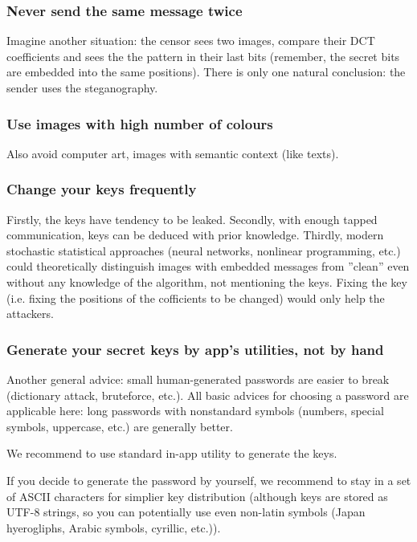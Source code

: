 \subsubsection{Never send the same message twice}

Imagine another situation: the censor sees two images, compare their DCT coefficients
and sees the the pattern in their last bits (remember, the secret bits are embedded into
the same positions). There is only one natural conclusion: the sender uses the steganography.

\subsubsection{Use images with high number of colours}
Also avoid computer art, images with semantic context (like texts).

\subsubsection{Change your keys frequently}
Firstly, the keys have tendency to be leaked. Secondly, with enough tapped communication,
keys can be deduced with prior knowledge. Thirdly, modern stochastic statistical approaches 
(neural networks, nonlinear programming, etc.) could theoretically distinguish images with
embedded messages from ''clean'' even without any knowledge of the algorithm, not mentioning
the keys. Fixing the key (i.e. fixing the positions of the cofficients to be changed)
would only help the attackers.


\subsubsection{Generate your secret keys by app's utilities, not by hand}
Another general advice: small human-generated passwords are easier to break (dictionary attack,
bruteforce, etc.). All basic advices for choosing a password are applicable here: long passwords
with nonstandard symbols (numbers, special symbols, uppercase, etc.) are generally better.

We recommend to use standard in-app utility to generate the keys.

If you decide to generate the password by yourself, 
we recommend to stay in a set of ASCII characters for simplier key distribution (although keys are
stored as UTF-8 strings, so you can potentially use even non-latin symbols 
(Japan hyerogliphs, Arabic symbols, cyrillic, etc.)).

